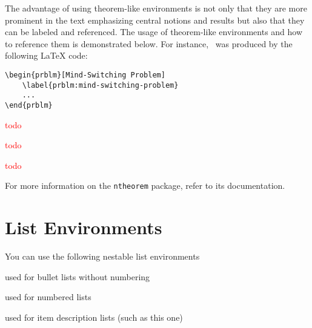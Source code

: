 The advantage of using theorem-like environments is not only that they are more prominent in the text emphasizing central notions and results but also that they can be labeled and referenced. The usage of theorem-like environments and how to reference them is demonstrated below. For instance,~ was produced by the following \LaTeX{} code: 
\begin{Verbatim}
\begin{prblm}[Mind-Switching Problem] 
	\label{prblm:mind-switching-problem}
	...
\end{prblm} 
\end{Verbatim}

\begin{prblm} 
    \label{prblm:mind-switching-problem}
    \textcolor{red}{todo} %
\end{prblm} 

\begin{defn}
	\textcolor{red}{todo} %
\end{defn}

\begin{thm}
	\textcolor{red}{todo} %
\end{thm}

For more information on the \texttt{ntheorem} package, refer to its documentation. %

\section{List Environments} 

You can use the following nestable list environments 
\begin{description}[font=\normalfont\ttfamily]
	\item[itemize] used for bullet lists without numbering
	\item[enumerate] used for numbered lists 
	\item[description] used for item description lists (such as this one)
\end{description}

